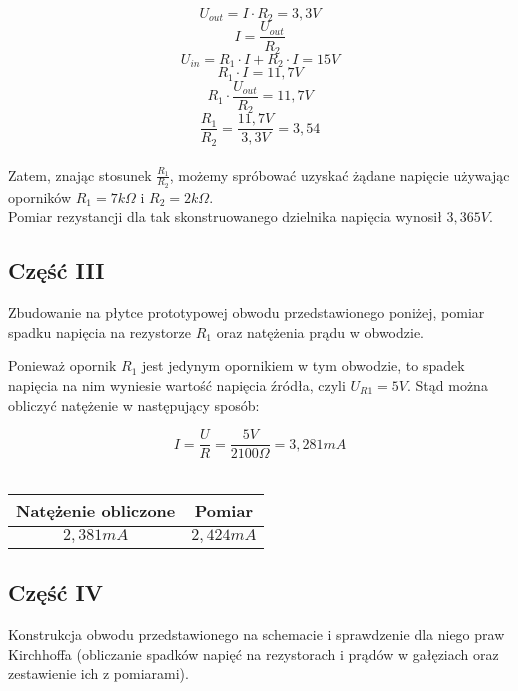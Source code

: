 \documentclass[polish,a4paper]{article}
\begin{document}
$$
U_{out} = I\cdot R_{2} = 3,3V
$$
$$
I = \frac{U_{out}}{R_{2}}
$$
$$
U_{in} = R_{1}\cdot I + R_{2}\cdot I = 15V
$$
$$
R_{1}\cdot I = 11,7V
$$
$$
R_{1}\cdot\frac{U_{out}}{R_{2}} = 11,7V
$$
$$
\frac{R_{1}}{R_{2}} = \frac{11,7V}{3,3V} = 3,54
$$
\\
Zatem, znając stosunek $\frac{R_{1}}{R_{2}}$, możemy spróbować uzyskać żądane napięcie używając oporników $R_{1} = 7k\Omega$ i $R_{2} = 2k\Omega$.\\
Pomiar rezystancji dla tak skonstruowanego dzielnika napięcia wynosił $3,365V$.

\subsection{Część III}

Zbudowanie na płytce prototypowej obwodu przedstawionego poniżej, pomiar spadku napięcia na rezystorze $R_{1}$ oraz natężenia prądu w obwodzie.

\begin{figure}[!h]
\centering
{}
\end{figure}
\begin{flushleft}
Ponieważ opornik $R_{1}$ jest jedynym opornikiem w tym obwodzie, to spadek napięcia na nim wyniesie wartość napięcia źródła, czyli $U_{R1}=5V$. Stąd można obliczyć natężenie w następujący sposób:
\end{flushleft}
$$
I=\frac{U}{R}=\frac{5V}{2100\Omega}=3,281mA
$$
\\
\begin{tabular}{|c|c|}
\hline
\textbf{Natężenie obliczone} & \textbf{Pomiar}\\
\hline
$2,381mA$ & $2,424mA$\\
\hline
\end{tabular}

\subsection{Część IV}
Konstrukcja obwodu przedstawionego na schemacie i sprawdzenie dla niego praw Kirchhoffa (obliczanie spadków napięć na rezystorach i prądów w gałęziach oraz zestawienie ich z pomiarami).
\end{document}
